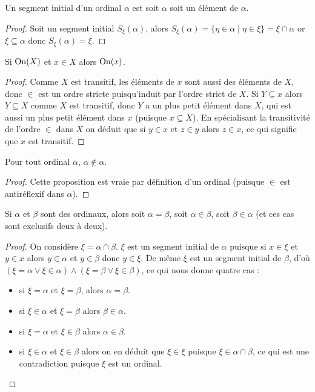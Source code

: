 \begin{prop}
    Un segment initial d'un ordinal $\alpha$ est soit $\alpha$ soit un élément de $\alpha$.
\end{prop}

\begin{proof}
    Soit un segment initial $S_\xi(\alpha)$, alors $S_\xi(\alpha) =\{\eta\in \alpha\mid \eta\in \xi\} = \xi\cap \alpha$ or $\xi\subseteq \alpha$ donc $S_\xi(\alpha) = \xi$.
\end{proof}

\begin{prop}
    Si $\mathrm{On}(X)$ et $x\in X$ alors $\mathrm{On}(x)$.
\end{prop}

\begin{proof}
    Comme $X$ est transitif, les éléments de $x$ sont aussi des éléments de $X$, donc $\in$ est un ordre stricte puisqu'induit par l'ordre strict de $X$. Si $Y\subseteq x$ alors $Y\subseteq X$ comme $X$ est transitif, donc $Y$ a un plus petit élément dans $X$, qui est aussi un plus petit élément dans $x$ (puisque $x\subseteq X$). En spécialisant la transitivité de l'ordre $\in$ dans $X$ on déduit que si $y\in x$ et $z\in y$ alors $z\in x$, ce qui signifie que $x$ est transitif.
\end{proof}

\begin{prop}
    Pour tout ordinal $\alpha$, $\alpha\notin\alpha$.
\end{prop}

\begin{proof}
    Cette proposition est vraie par définition d'un ordinal (puisque $\in$ est antiréflexif dans $\alpha$).
\end{proof}

\begin{prop}
    Si $\alpha$ et $\beta$ sont des ordinaux, alors soit $\alpha = \beta$, soit $\alpha\in\beta$, soit $\beta\in\alpha$ (et ces cas sont exclusifs deux à deux).
\end{prop}

\begin{proof}
    On considère $\xi = \alpha \cap\beta$. $\xi$ est un segment initial de $\alpha$ puisque si $x\in \xi$ et $y\in x$ alors $y\in \alpha$ et $y\in \beta$ donc $y\in \xi$. De même $\xi$ est un segment initial de $\beta$, d'où $(\xi = \alpha\lor \xi \in \alpha)\land (\xi =\beta\lor \xi\in \beta)$, ce qui nous donne quatre cas :
    \begin{itemize}
        \item si $\xi =\alpha$ et $\xi = \beta$, alors $\alpha = \beta$.
        \item si $\xi \in \alpha$ et $\xi = \beta$ alors $\beta\in \alpha$.
        \item si $\xi = \alpha$ et $\xi \in \beta$ alors $\alpha\in \beta$.
        \item si $\xi \in \alpha$ et $\xi \in \beta$ alors on en déduit que $\xi \in \xi$ puisque $\xi \in \alpha \cap \beta$, ce qui est une contradiction puisque $\xi$ est un ordinal.
    \end{itemize}
\end{proof}

